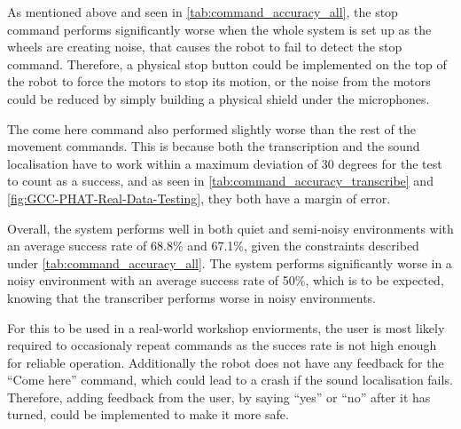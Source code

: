 As mentioned above and seen in \cref{tab:command_accuracy_all}, the stop command performs significantly worse when the whole system is set up as the wheels are creating noise, that causes the robot to fail to detect the stop command. Therefore, a physical stop button could be implemented on the top of the robot to force the motors to stop its motion, or the noise from the motors could be reduced by simply building a physical shield under the microphones.

The come here command also performed slightly worse than the rest of the movement commands. This is because both the transcription and the sound localisation have to work within a maximum deviation of 30 degrees for the test to count as a success, and as seen in \cref{tab:command_accuracy_transcribe} and \cref{fig:GCC-PHAT-Real-Data-Testing}, they both have a margin of error.

Overall, the system performs well in both quiet and semi-noisy environments with an average success rate of 68.8\% and 67.1\%, given the constraints described under \cref{tab:command_accuracy_all}. The system performs significantly worse in a noisy environment with an average success rate of 50\%, which is to be expected, knowing that the transcriber performs worse in noisy environments.

For this to be used in a real-world workshop enviorments, the user is most likely required to occasionaly repeat commands as the succes rate is not high enough for reliable operation. Additionally the robot does not have any feedback for the ``Come here'' command, which could lead to a crash if the sound localisation fails. Therefore, adding feedback from the user, by saying ``yes'' or ``no'' after it has turned, could be implemented to make it more safe.